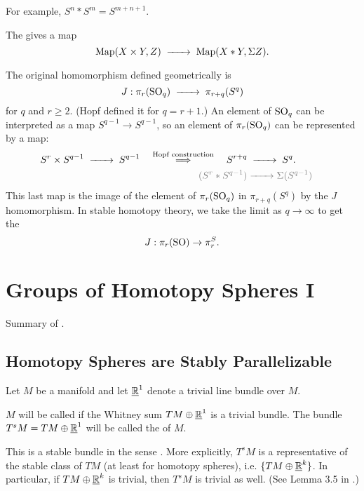 For example, $S^n * S^m = S^{m+n+1}$.

\begin{definition}
	The  gives a map
	\[
		\Map(X\times Y, Z) \lkxto \Map(X * Y, \Sigma Z).
	\]
\end{definition}

The original homomorphism defined geometrically is
\[
		J : \pi_r(\SO_q) \lkxto \pi_{r+q}(S^q)
\]
for $q$ and $r\geq 2$. (Hopf defined it for $q=r+1$.) An element of ${\operatorname{SO}}_q$ can be interpreted as a map $S^{q-1} \to S^{q-1}$, so an element of $\pi_r({\operatorname{SO}}_q)$ can be represented by a map:
\[
	\begin{aligned}
	S^r \times S^{q-1} \lkxto S^{q-1} \quad\overset{\textrm{Hopf construction}}{\implies}\quad 
	 S^{r+q} &\lkxto S^q.\phantom{(S^{q-1})}\\
	 \textcolor{gray}{(S^r * S^{q-1})} &\textcolor{gray}{\lkxto} \textcolor{gray}{\Sigma (S^{q-1})}
\end{aligned}
\]
This last map is the image of the element of $\pi_r({\operatorname{SO}}_q)$ in $\pi_{r+q}(S^q)$ by the $J$ homomorphism. In stable homotopy theory, we take the limit as $q\to \infty$ to get the 
\[
		J : \pi_r({\operatorname{SO}}) \to \pi_r^S.
\]

\chapter{Groups of Homotopy Spheres I}

Summary of \cite{milnor1963groups}.

\section{Homotopy Spheres are Stably Parallelizable}

Let $M$ be a manifold and let $\underline{\mathbb{R}}^1$ denote a trivial line bundle over $M$.

\begin{definition}
	$M$ will be called  if the Whitney sum $TM \oplus \underline{\mathbb{R}}^1$ is  a trivial bundle. The bundle $T^sM = TM\oplus\underline{\mathbb{R}}^1$ will be called the  of $M$.
\end{definition}

This is a stable bundle in the sense \cite{kervaire1959}. More explicitly, $T^sM$ is a representative of the stable class of $TM$ (at least for homotopy spheres), i.e. $\{TM\oplus \underline{\mathbb{R}}^k\}$. In particular, if $TM\oplus \underline{\mathbb{R}}^k$ is trivial, then $T^s M$ is trivial as well. (See Lemma 3.5 in \cite{milnor1963groups}.)

